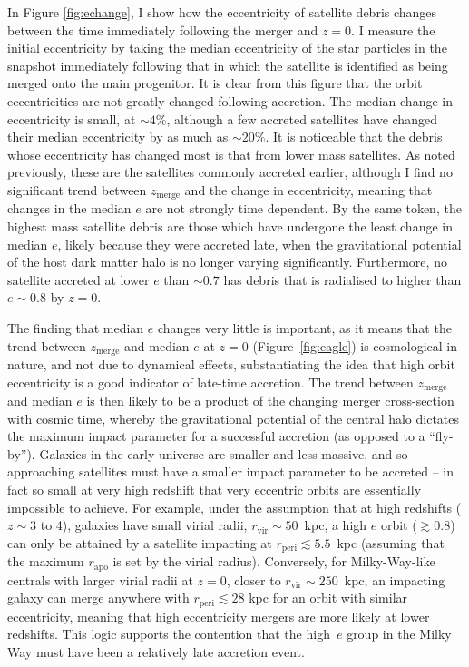 In Figure \ref{fig:echange}, I show how the eccentricity of satellite
debris changes between the time immediately following the merger and $z=0$. I measure
the initial eccentricity by taking the median eccentricity of the
star particles in the snapshot immediately following that in which
the satellite is identified as being merged onto the main progenitor.
It is clear from this figure that the orbit eccentricities are not
greatly changed following accretion. The median change in eccentricity
is small, at $\sim 4\%$, although a few accreted satellites have
changed their median eccentricity by as much as $\sim 20 \%$. It
is noticeable that the debris whose eccentricity has changed most
is that from lower mass satellites.  As noted previously, these are
the satellites commonly accreted earlier, although I find no
significant trend between $z_\mathrm{merge}$ and the change in
eccentricity, meaning that changes in the median $e$ are not strongly
time dependent.  By the same token, the highest mass satellite
debris are those which have undergone the least change in median
$e$, likely because they were accreted late, when the gravitational
potential of the host dark matter halo is no longer varying
significantly. Furthermore, no satellite accreted at lower $e$
than $\sim 0.7$ has debris that is radialised to higher than $e
\sim 0.8$ by $z=0$. 

The finding that median $e$ changes very little
is important, as it means that the trend between $z_\mathrm{merge}$
and median $e$ at $z=0$ (Figure~\ref{fig:eagle}) is cosmological
in nature, and not due to dynamical effects, substantiating the
idea that high orbit eccentricity is a good indicator of late-time
accretion.  The trend between $z_\mathrm{merge}$ and median $e$ is then
likely to be a product of the changing merger cross-section with cosmic
time, whereby the gravitational potential of the central halo
dictates the maximum impact parameter for a successful accretion
(as opposed to a ``fly-by'').  Galaxies in the early universe are
smaller and less massive, and so approaching satellites must have
a smaller impact parameter to be accreted -- in fact so small
at very high redshift that very eccentric orbits are essentially
impossible to achieve.  For example, under the assumption that at high redshifts ($z\sim$3 to 4), galaxies have small virial radii, $r_\mathrm{vir} \sim
50$~kpc, a high $e$ orbit ($\gtrsim 0.8$) can only be attained by a satellite impacting at $r_{\mathrm{peri}}\lesssim 5.5$~kpc (assuming that the maximum $r_\mathrm{apo}$ is set by the virial radius).  Conversely, for Milky-Way-like centrals with larger virial radii at $z=0$, closer to $r_\mathrm{vir} \sim
250$~kpc, an impacting galaxy can merge anywhere with $r_\mathrm{peri}\lesssim 28$ kpc for an
orbit with similar eccentricity, meaning that high eccentricity mergers are more likely at lower redshifts. This logic supports the contention
that the high~$e$ group in the Milky Way must have been a relatively
late accretion event.

